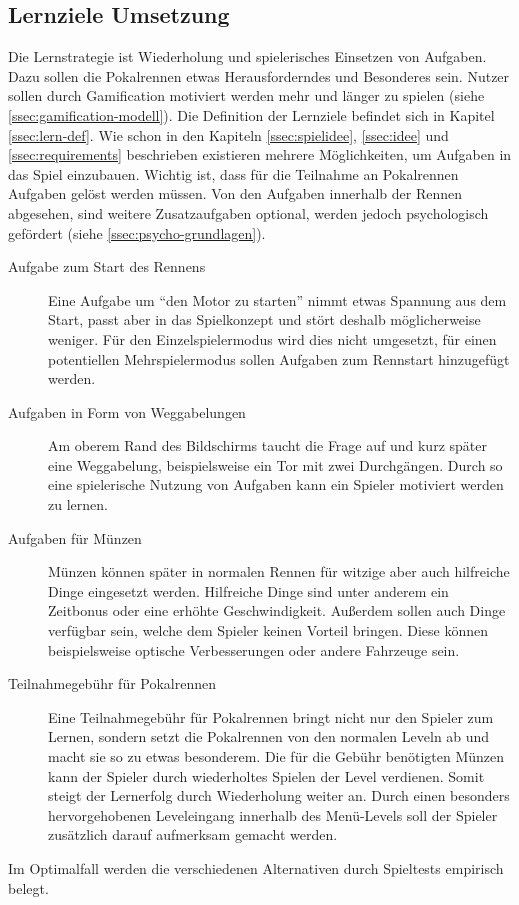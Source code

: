 \subsection{Lernziele Umsetzung}
	Die Lernstrategie ist Wiederholung und spielerisches Einsetzen von Aufgaben. Dazu sollen die Pokalrennen etwas Herausforderndes und Besonderes sein. Nutzer sollen durch Gamification motiviert werden mehr und länger zu spielen (siehe \ref{ssec:gamification-modell}).
	Die Definition der Lernziele befindet sich in Kapitel \ref{ssec:lern-def}.
	Wie schon in den Kapiteln \ref{ssec:spielidee}, \ref{ssec:idee} und \ref{ssec:requirements} beschrieben existieren mehrere Möglichkeiten, um Aufgaben in das Spiel einzubauen. Wichtig ist, dass für die Teilnahme an Pokalrennen Aufgaben gelöst werden müssen. Von den Aufgaben innerhalb der Rennen abgesehen, sind weitere Zusatzaufgaben optional, werden jedoch psychologisch gefördert (siehe \ref{ssec:psycho-grundlagen}).
	\begin{description}
		\item[Aufgabe zum Start des Rennens]{
			Eine Aufgabe um \enquote{den Motor zu starten} nimmt etwas Spannung aus dem Start, passt aber in das Spielkonzept und stört deshalb möglicherweise weniger.
			Für den Einzelspielermodus wird dies nicht umgesetzt, für einen potentiellen Mehrspielermodus sollen Aufgaben zum Rennstart hinzugefügt werden.
		}
		\item[Aufgaben in Form von Weggabelungen]{
			Am oberem Rand des Bildschirms taucht die Frage auf und kurz später eine Weggabelung, beispielsweise ein Tor mit zwei Durchgängen. Durch so eine spielerische Nutzung von Aufgaben kann ein Spieler motiviert werden zu lernen.
		}
		\item[Aufgaben für Münzen]{
			Münzen können später in normalen Rennen für witzige aber auch hilfreiche Dinge eingesetzt werden. Hilfreiche Dinge sind unter anderem ein Zeitbonus oder eine erhöhte Geschwindigkeit. Außerdem sollen auch Dinge verfügbar sein, welche dem Spieler keinen Vorteil bringen. Diese können beispielsweise optische Verbesserungen oder andere Fahrzeuge sein.
		}
		\item[Teilnahmegebühr für Pokalrennen]{
			Eine Teilnahmegebühr für Pokalrennen bringt nicht nur den Spieler zum Lernen, sondern setzt die Pokalrennen von den normalen Leveln ab und macht sie so zu etwas besonderem. Die für die Gebühr benötigten Münzen kann der Spieler durch wiederholtes Spielen der Level verdienen. Somit steigt der Lernerfolg durch Wiederholung weiter an. Durch einen besonders hervorgehobenen Leveleingang innerhalb des Menü-Levels soll der Spieler zusätzlich darauf aufmerksam gemacht werden.
		}
	\end{description}
	Im Optimalfall werden die verschiedenen Alternativen durch Spieltests empirisch belegt.

